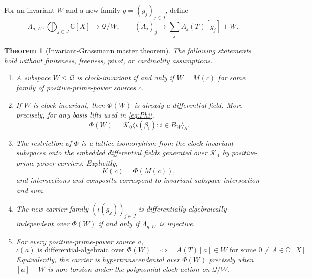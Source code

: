\documentclass[11pt]{article}
\newtheorem{theorem}{Theorem}[section]
\theoremstyle{definition}
\theoremstyle{remark}
\newcommand{\C}{\mathbb C}
\newcommand{\cK}{\mathcal K}
\newcommand{\cQ}{\mathcal Q}
\newcommand{\diff}{\partial}
\begin{document}
For an invariant \(W\) and a new family \(g=(g_j)_{j\in J}\), define
\begin{equation}\label{eq:lambda}
  \Lambda_{g,W}:\bigoplus_{j\in J}\C[X]\longrightarrow\cQ/W,
  \qquad (A_j)_j\longmapsto\sum_j A_j(T)[g_j]+W.
\end{equation}

\begin{theorem}[Invariant-Grassmann master theorem]\label{thm:master}
The following statements hold without finiteness, freeness, pivot, or cardinality assumptions.
\begin{enumerate}[label=\textup{(\roman*)},leftmargin=2.5em]
  \item A subspace \(W\leq\cQ\) is clock-invariant if and only if
  \(W=M(c)\) for some family of positive-prime-power sources \(c\).

  \item If \(W\) is clock-invariant, then \(\Phi(W)\) is already a differential field.  More
  precisely, for any basis lifts used in \eqref{eq:Phi},
  \begin{equation}\label{eq:differentialPhi}
    \Phi(W)=\cK_0\langle\iota(\beta_i):i\in B_W\rangle_{\diff}.
  \end{equation}

  \item The restriction of \(\Phi\) is a lattice isomorphism from the clock-invariant subspaces
  onto the embedded differential fields generated over \(\cK_0\) by positive-prime-power
  carriers.  Explicitly,
  \begin{equation}\label{eq:Kc-Phi}
    K(c)=\Phi(M(c)),
  \end{equation}
  and intersections and composita correspond to invariant-subspace intersection and sum.

  \item The new carrier family \((\iota(g_j))_{j\in J}\) is differentially algebraically
  independent over \(\Phi(W)\) if and only if \(\Lambda_{g,W}\) is injective.

  \item For every positive-prime-power source \(a\),
  \begin{equation}\label{eq:closure-representation}
    \iota(a)\text{ is differential-algebraic over }\Phi(W)
    \quad\Longleftrightarrow\quad
    A(T)[a]\in W\text{ for some }0\neq A\in\C[X].
  \end{equation}
  Equivalently, the carrier is hypertranscendental over \(\Phi(W)\) precisely when
  \([a]+W\) is non-torsion under the polynomial clock action on \(\cQ/W\).
\end{enumerate}
\end{theorem}
\end{document}
